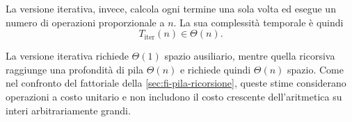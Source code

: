 La versione iterativa, invece, calcola ogni termine una sola volta
ed esegue un numero di operazioni proporzionale a \(n\). La sua
complessità temporale è quindi
\[
  T_{\mathrm{iter}}(n)\in\Theta(n).
\]

La versione iterativa richiede \(\Theta(1)\) spazio ausiliario,
mentre quella ricorsiva raggiunge una profondità di pila
\(\Theta(n)\) e richiede quindi \(\Theta(n)\) spazio.
Come nel confronto del fattoriale della
\cref{sec:fi-pila-ricorsione}, queste stime considerano
operazioni a costo unitario e non includono il costo crescente
dell'aritmetica su interi arbitrariamente grandi.
